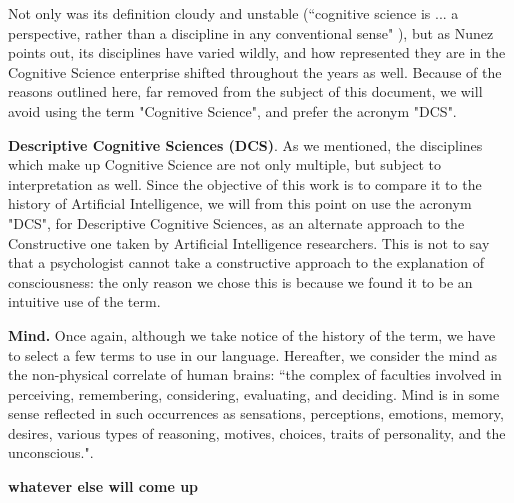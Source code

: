 \documentclass[../main.tex]{subfiles}
\begin{document}
Not only was its definition cloudy and unstable (“cognitive science is ... a perspective, rather than a discipline in any conventional sense" \cite{sheehyCognitiveScience1995}), but as Nunez points out, its disciplines have varied wildly, and how represented they are in the Cognitive Science enterprise shifted throughout the years as well. Because of the reasons outlined here, far removed from the subject of this document, we will avoid using the term "Cognitive Science", and prefer the acronym "DCS".

\vspace{5pt}
\textbf{Descriptive Cognitive Sciences (DCS)}. As we mentioned, the disciplines which make up Cognitive Science are not only multiple, but subject to interpretation as well. Since the objective of this work is to compare it to the history of Artificial Intelligence, we will from this point on use the acronym "DCS", for Descriptive Cognitive Sciences, as an alternate approach to the Constructive one taken by Artificial Intelligence researchers. This is not to say that a psychologist cannot take a constructive approach to the explanation of consciousness: the only reason we chose this is because we found it to be an intuitive use of the term.

\vspace{5pt}
\textbf{Mind.} Once again, although we take notice of the history of the term, we have to select a few terms to use in our language. Hereafter, we consider the mind as the non-physical correlate of human brains: ``the complex of faculties involved in perceiving, remembering, considering, evaluating, and deciding. Mind is in some sense reflected in such occurrences as sensations, perceptions, emotions, memory, desires, various types of reasoning, motives, choices, traits of personality, and the unconscious."\cite{Mind}.

\vspace{5pt}
\textbf{whatever else will come up}
\end{document}
